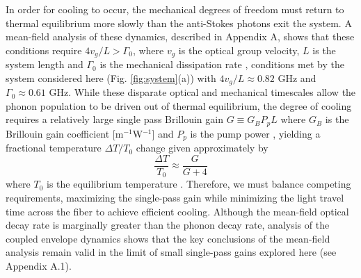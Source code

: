 In order for cooling to occur, the mechanical degrees of freedom must return to thermal equilibrium more slowly than the anti-Stokes photons exit the system. A mean-field analysis of these dynamics, described in Appendix A, shows that these conditions require $4v_g/L > \Gamma_0$, where $v_g$ is the optical group velocity, $L$ is the system length and $\Gamma_0$ is the mechanical dissipation rate \cite{otterstrom2018optomechanical}, conditions met by the system considered here (Fig. \ref{fig:system}(a)) with $4 v_g/L \approx 0.82$ GHz and $\Gamma_0 \approx 0.61$ GHz. While these disparate optical and mechanical timescales allow the phonon population to be driven out of thermal equilibrium, the degree of cooling requires a relatively large single pass Brillouin gain $G \equiv G_B P_p L$ where $G_B$ is the Brillouin gain coefficient [m$^{-1}$W$^{-1}$] and $P_p$ is the pump power \cite{boyd2020nonlinear}, yielding a fractional temperature $\Delta T/T_0$ change given approximately by
\begin{equation}
\label{eq:FFC}
   \frac{\Delta T}{T_0} \approx \frac{G}{G+4}
\end{equation}
where $T_0$ is the equilibrium temperature \cite{otterstrom2018optomechanical}. Therefore, we must balance competing requirements, maximizing the single-pass gain while minimizing the light travel time across the fiber to achieve efficient cooling. Although the mean-field optical decay rate is marginally greater than the phonon decay rate, analysis of the coupled envelope dynamics shows that the key conclusions of the mean-field analysis remain valid in the limit of small single-pass gains explored here (see Appendix A.1).

